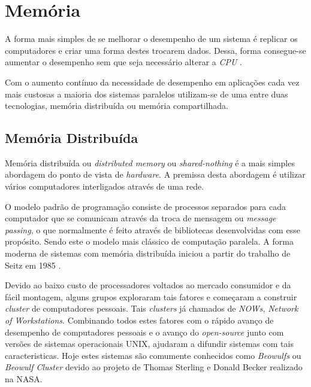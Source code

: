 \section{Memória}

A forma mais simples de se melhorar o desempenho de um sistema é
replicar os computadores e criar uma forma destes trocarem dados.
Dessa, forma consegue-se aumentar o desempenho sem que seja necessário alterar a
\textit{CPU} \cite[2.2]{sopc}.

Com o aumento contínuo da necessidade de desempenho em aplicações cada vez mais
custosas a maioria dos sistemas paralelos utilizam-se de uma entre duas
tecnologias, memória distribuída ou memória compartilhada.


\subsection{Memória Distribuída}

Memória distribuída ou \textit{distributed memory} ou \textit{shared-nothing} é
a mais simples abordagem do ponto de vista de \textit{hardware}. 
A premissa desta abordagem é utilizar vários computadores interligados através 
de uma rede.

O modelo padrão de programação consiste de processos separados para cada
computador que se comunicam através da troca de mensagem ou 
\textit{message passing}, o que normalmente é feito através de bibliotecas
desenvolvidas com esse propósito. 
Sendo este o modelo mais clássico de computação paralela. 
A forma moderna de sistemas com memória distribuída iniciou a partir do trabalho 
de Seitz em 1985 \cite{Seitz:1985}.

Devido ao baixo custo de processadores voltados ao mercado consumidor e da fácil
montagem, alguns grupos exploraram tais fatores e começaram a construir
\textit{cluster} de computadores pessoais. 
Tais \textit{clusters} já chamados de \textit{NOWs}, 
\textit{Network of Workstations}.
Combinando todos estes fatores com o rápido avanço de desempenho de computadores
pessoais e o avanço do \textit{open-source} junto com  versões de sistemas 
operacionais UNIX, ajudaram a difundir sistemas com tais caracteristicas. 
Hoje estes sistemas são comumente conhecidos como \textit{Beowulfs} ou
\textit{Beowulf Cluster} devido ao projeto de Thomas Sterling e Donald Becker
realizado na NASA.


